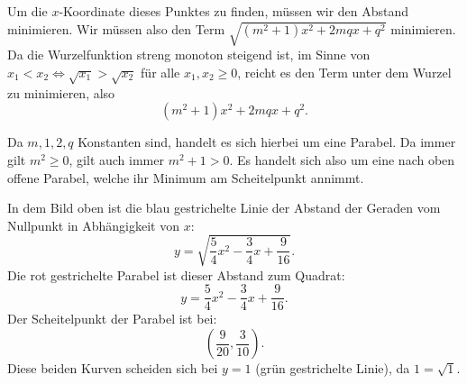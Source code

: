 \documentclass[a4paper]{amsart}
\theoremstyle{definition}
\begin{document}
Um die $x$-Koordinate dieses Punktes zu finden, müssen wir den Abstand minimieren. Wir müssen also den Term $\sqrt{(m^2+1)x^2 + 2mqx + q^2}$ minimieren. Da die Wurzelfunktion streng monoton steigend ist, im Sinne von $x_1 < x_2 \Leftrightarrow \sqrt{x_1} > \sqrt{x_2}$ für alle $x_1, x_2 \ge 0$, reicht es den Term unter dem Wurzel zu minimieren, also
\begin{equation}
   (m^2+1)x^2 + 2mqx + q^2.
\end{equation}

Da $m,1,2,q$ Konstanten sind, handelt es sich hierbei um eine Parabel. Da immer gilt $m^2 \ge 0$, gilt auch immer $m^2 + 1 > 0$. Es handelt sich also um eine nach oben offene Parabel, welche ihr Minimum am Scheitelpunkt annimmt.


In dem Bild oben ist die blau gestrichelte Linie der Abstand der Geraden vom Nullpunkt in Abhängigkeit von $x$:
\begin{equation}
   y = \sqrt{ \frac{5}{4}x^2 - \frac{3}{4}x + \frac{9}{16} }.
\end{equation}
Die rot gestrichelte Parabel ist dieser Abstand zum Quadrat:
\begin{equation}
   y = \frac{5}{4}x^2 - \frac{3}{4}x + \frac{9}{16}.
\end{equation}
Der Scheitelpunkt der Parabel ist bei:
\begin{equation}
   \left( \frac{9}{20}, \frac{3}{10} \right ).
\end{equation}
Diese beiden Kurven scheiden sich bei $y=1$ (grün gestrichelte Linie), da $1 = \sqrt 1$.
\end{document}
